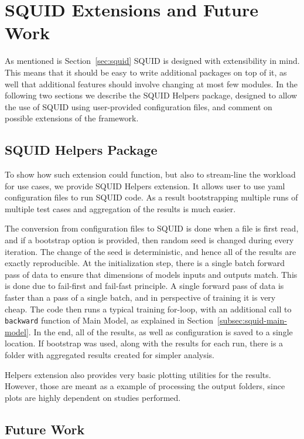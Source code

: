 \section{SQUID Extensions and Future Work}
\label{sec:ext}
As mentioned is Section~\ref{sec:squid} SQUID is designed with extensibility in mind.
This means that it should be easy to write additional packages on top of it, as well that additional features should involve changing at most few modules. In the following two sections we describe the SQUID Helpers package, designed to allow the use of SQUID using user-provided configuration files, and comment on possible extensions of the framework.

\subsection{SQUID Helpers Package}
\label{sec:squid_hlp}
To show how such extension could function, but also to stream-line the workload for use cases,
we provide SQUID Helpers extension.
It allows user to use yaml configuration files to run SQUID code.
As a result bootstrapping multiple runs of multiple test cases and aggregation of the results is much easier.

The conversion from configuration files to SQUID is done when a file is first read, and if a bootstrap option is provided, then random seed is changed during every iteration.
The change of the seed is deterministic, and hence all of the results are exactly reproducible.
At the initialization step, there is a single batch forward pass of data to ensure that dimensions of models inputs and outputs match.
This is done due to fail-first and fail-fast principle.
A single forward pass of data is faster than a pass of a single batch, and in perspective of training it is very cheap.
The code then runs a typical training for-loop, with an additional call to \texttt{backward} function of Main Model, as explained in Section~\ref{subsec:squid-main-model}.
In the end, all of the results, as well as configuration is saved to a single location.
If bootstrap was used, along with the results for each run, there is a folder with aggregated results created for simpler analysis.

Helpers extension also provides very basic plotting utilities for the results.
However, those are meant as a example of processing the output folders, since plots are highly dependent on studies performed.

\subsection{Future Work}

